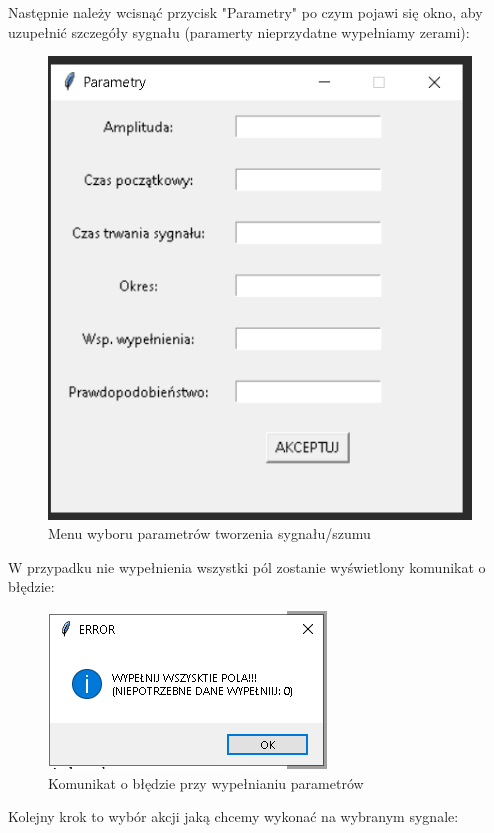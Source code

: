 \documentclass[12pt]{article}
\begin{document}
Następnie należy wcisnąć przycisk "{Parametry}" { }po czym pojawi się okno, aby uzupełnić szczegóły sygnału (paramerty nieprzydatne wypełniamy zerami):
\begin{figure}[H]
\centering
\includegraphics[scale=0.65]{menu22.png}
\caption{Menu wyboru parametrów tworzenia sygnału/szumu}
\end{figure}
W przypadku nie wypełnienia wszystki pól zostanie wyświetlony komunikat o błędzie:
\begin{figure}[H]
\centering
\includegraphics[scale=0.9]{menu33.png}
\caption{Komunikat o błędzie przy wypełnianiu parametrów}
\end{figure}
Kolejny krok to wybór akcji jaką chcemy wykonać na wybranym sygnale:
\end{document}
